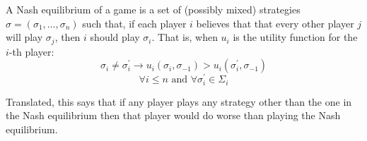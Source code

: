 \documentclass[12pt]{article}
\begin{document}
A Nash equilibrium of a game is a set of (possibly mixed) strategies $\sigma=(\sigma_1,\ldots,\sigma_n)$ such that, if each player $i$ believes that that every other player $j$ will play $\sigma_j$, then $i$ should play $\sigma_i$.  That is, when $u_i$ is the utility function for the $i$-th player:
\begin{displaymath}
\sigma_i\neq \sigma^\prime_i\rightarrow u_i(\sigma_i,\sigma_{-1})>u_i(\sigma^\prime_i,\sigma_{-1})
\end{displaymath}
\begin{displaymath}
\forall i\leq n \text{ and } \forall \sigma^\prime_i\in \Sigma_i
\end{displaymath}

Translated, this says that if any player plays any strategy other than the one in the Nash equilibrium then that player would do worse than playing the Nash equilibrium.
\end{document}
